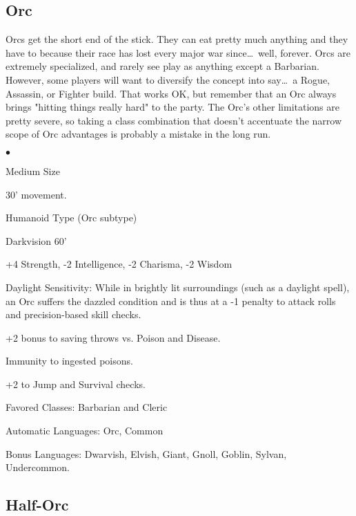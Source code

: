 \subsection{Orc}
\vspace*{-8pt}

Orcs get the short end of the stick. They can eat pretty much anything and they have to because their race has lost every major war since\ldots\ well, forever. Orcs are extremely specialized, and rarely see play as anything except a Barbarian. However, some players will want to diversify the concept into say\ldots\  a Rogue, Assassin, or Fighter build. That works OK, but remember that an Orc always brings "hitting things really hard" to the party. The Orc's other limitations are pretty severe, so taking a class combination that doesn't accentuate the narrow scope of Orc advantages is probably a mistake in the long run.

\begin{list}{$\bullet$}{\itemspace}
    \item Medium Size
    \item 30' movement.
    \item Humanoid Type (Orc subtype)
    \item Darkvision 60'
    \item +4 Strength, -2 Intelligence, -2 Charisma, -2 Wisdom
    \item Daylight Sensitivity: While in brightly lit surroundings (such as a daylight spell), an Orc suffers the dazzled condition and is thus at a -1 penalty to attack rolls and precision-based skill checks.
    \item +2 bonus to saving throws vs. Poison and Disease.
    \item Immunity to ingested poisons.
    \item +2 to Jump and Survival checks.
    \item Favored Classes: Barbarian and Cleric
    \item Automatic Languages: Orc, Common
    \item Bonus Languages: Dwarvish, Elvish, Giant, Gnoll, Goblin, Sylvan, Undercommon.
\end{list}

\subsection{Half-Orc}
\vspace*{-8pt}

